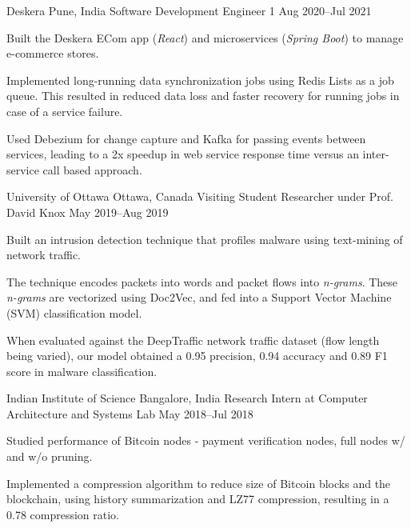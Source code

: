 \documentclass[11pt,a4paper]{article}
\begin{document}
\begin{resumesection}

\headeditem
{Deskera}
{Pune, India}
{Software Development Engineer 1}
{Aug 2020--Jul 2021}
\begin{resumelist}
	\item Built the Deskera ECom app (\textit{React}) and microservices (\textit{Spring Boot}) to manage e-commerce stores.
	\item Implemented long-running data synchronization jobs using Redis Lists as a job queue. This resulted in reduced data loss and faster recovery for running jobs in case of a service failure.
	\item Used Debezium for change capture and Kafka for passing events between services, leading to a 2x speedup in web service response time versus an inter-service call based approach.
\end{resumelist}

\headeditem
{University of Ottawa}
{Ottawa, Canada}
{Visiting Student Researcher under Prof. David Knox}
{May 2019--Aug 2019}
\begin{resumelist}
	\item Built an intrusion detection technique that profiles malware using text-mining of network traffic.
	\item The technique encodes packets into words and packet flows into \textit{n-grams}. These \textit{n-grams} are vectorized using Doc2Vec, and fed into a Support Vector Machine (SVM) classification model.
	\item When evaluated against the DeepTraffic network traffic dataset (flow length being varied), our model obtained a 0.95 precision, 0.94 accuracy and 0.89 F1 score in malware classification.
\end{resumelist}

\headeditem
{Indian Institute of Science}
{Bangalore, India}
{Research Intern at Computer Architecture and Systems Lab}
{May 2018--Jul 2018}
\begin{resumelist}
	\item Studied performance of Bitcoin nodes - payment verification nodes, full nodes w/ and w/o pruning.
	\item Implemented a compression algorithm to reduce size of Bitcoin blocks and the blockchain, using history summarization and LZ77 compression, resulting in a 0.78 compression ratio.
\end{resumelist}
\end{resumesection}
\end{document}
